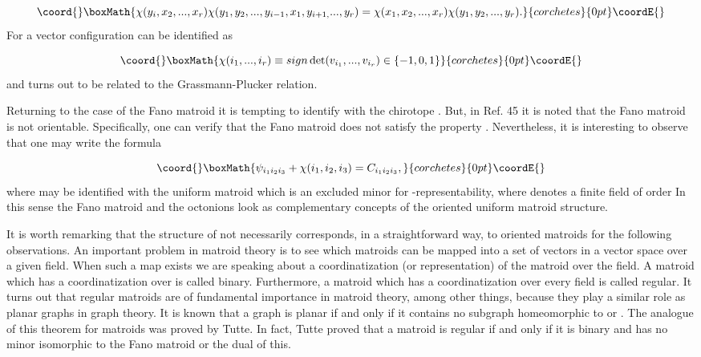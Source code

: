 \documentclass[a4paper,12pt]{article}
\begin{document}
\[\coord{}\boxMath{
\chi (y_{i},x_{2},...,x_{r})\chi
(y_{1},y_{2},...,y_{i-1},x_{1},y_{i+1,}...,y_{r})=\chi
(x_{1},x_{2},...,x_{r})\chi (y_{1},y_{2},...,y_{r}). 
}{corchetes}{0pt}\coordE{}\]
For a vector configuration \myHighlight{$\chi $}\coordHE{} can be identified as

\[\coord{}\boxMath{
\chi (i_{1},...,i_{r})\equiv sign\det (v_{i_{1}},...,v_{i_{r}})\in
\{-1,0,1\} 
}{corchetes}{0pt}\coordE{}\]
and \coordHE{} turns out to be related to the Grassmann-Plucker relation.

Returning to the case of the Fano matroid it is tempting to identify \coordHE{}
with the chirotope \coordHE{}. But, in Ref. 45 it is noted that the Fano
matroid is not orientable. Specifically, one can verify that the Fano
matroid does not satisfy the property \coordHE{}. Nevertheless, it is
interesting to observe that one may write the formula\coordHE{}

\[\coord{}\boxMath{
\psi _{i_{1}i_{2}i_{3}}+\chi (i_{1},i_{2},i_{3})=C_{i_{1}i_{2}i_{3}}, 
}{corchetes}{0pt}\coordE{}\]
where \coordHE{} may be identified with the uniform
matroid \coordHE{} which is an excluded minor for \coordHE{}-representability,
where \coordHE{} denotes a finite field of order \coordHE{} In this sense the Fano
matroid and the octonions look as complementary concepts of the oriented
uniform matroid \coordHE{} structure.

It is worth remarking that the structure of \coordHE{} not necessarily
corresponds, in a straightforward way, to oriented matroids for the
following observations. An important problem in matroid theory is to see
which matroids can be mapped into a set of vectors in a vector space over a
given field. When such a map exists we are speaking about a coordinatization
(or representation) of the matroid over the field. A matroid which has a
coordinatization over \coordHE{} is called binary. Furthermore, a matroid which
has a coordinatization over every field is called regular. It turns out that
regular matroids are of fundamental importance in matroid theory, among
other things, because they play a similar role as planar graphs in graph
theory.\coordHE{} It is known that a graph is planar if and only if it contains
no subgraph homeomorphic to \coordHE{} or \coordHE{}. The analogue of this
theorem for matroids was proved by Tutte.\coordHE{} In fact, Tutte proved that a
matroid is regular if and only if it is binary and has no minor isomorphic
to the Fano matroid or the dual of this.
\end{document}
